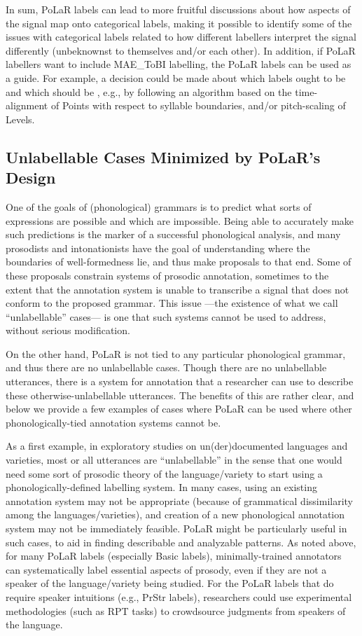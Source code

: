 \documentclass[11pt, twoside]{memoir}
\def\textlabel#1{{\relsize{-.5}\fontspec[Mapping=tex-text]{Roboto Mono}{#1}}}
\begin{document}
In sum, PoLaR labels can lead to more fruitful discussions about how aspects of the signal map onto categorical labels, making it possible to identify some of the issues with categorical labels related to how different labellers interpret the signal differently (unbeknownst to themselves and/or each other). In addition, if PoLaR labellers want to include MAE\_ToBI labelling, the PoLaR labels can be used as a guide.  For example, a decision could be made about which labels ought to be \textlabel{H*} and which should be \textlabel{L+H*}, e.g., by following an algorithm based on the time-alignment of Points with respect to syllable boundaries, and/or pitch-scaling of Levels.


\subsection{Unlabellable Cases Minimized by PoLaR’s Design}\label{sec:difficultunlabellable-cases}
One of the goals of (phonological) grammars is to predict what sorts of expressions are possible and which are impossible. Being able to accurately make such predictions is the marker of a successful phonological analysis, and many prosodists and intonationists have the goal of understanding where the boundaries of well-formedness lie, and thus make proposals to that end. Some of these proposals constrain systems of prosodic annotation, sometimes to the extent that the annotation system is unable to transcribe a signal that does not conform to the proposed grammar. This issue —the existence of what we call “unlabellable” cases— is one that such systems cannot be used to address, without serious modification.

On the other hand, PoLaR is not tied to any particular phonological grammar, and thus there are no unlabellable cases. Though there are no unlabellable utterances, there is a system for annotation that a researcher can use to describe these otherwise-unlabellable utterances. The benefits of this are rather clear, and below we provide a few examples of cases where PoLaR can be used where other phonologically-tied annotation systems cannot be.

As a first example, in exploratory studies on un(der)documented languages and varieties, most or all utterances are “unlabellable” in the sense that one would need some sort of prosodic theory of the language\slash variety to start using a phonologically-defined labelling system. In many cases, using an existing annotation system may not be appropriate (because of grammatical dissimilarity among the languages\slash varieties), and creation of a new phonological annotation system may not be immediately feasible. PoLaR might be particularly useful in such cases, to aid in finding describable and analyzable patterns. As noted above, for many PoLaR labels (especially Basic labels), minimally-trained annotators can systematically label essential aspects of prosody, even if they are not a speaker of the language\slash variety being studied. For the PoLaR labels that do require speaker intuitions (e.g., PrStr labels), researchers could use experimental methodologies (such as RPT tasks) to crowdsource judgments from speakers of the language.
\end{document}

